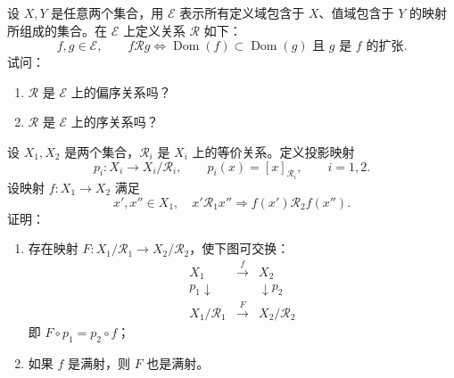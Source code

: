 \begin{exercise}
  \item 设 \(X,Y\) 是任意两个集合，用 \(\mathscr{E}\) 表示所有定义域包含于 \(X\)、值域包含于 \(Y\) 的映射所组成的集合。在 \(\mathscr{E}\) 上定义关系 \(\mathscr{R}\) 如下：
  \[
  f,g\in\mathscr{E},\qquad
  f\mathscr{R}g\iff
  \operatorname{Dom}(f)\subset\operatorname{Dom}(g)
  \text{ 且 }g\text{ 是 }f\text{ 的扩张}.
  \]
  试问：
  \begin{enumerate}[label=\arabic*)]
    \item \(\mathscr{R}\) 是 \(\mathscr{E}\) 上的偏序关系吗？
    \item \(\mathscr{R}\) 是 \(\mathscr{E}\) 上的序关系吗？
  \end{enumerate}
\end{exercise}

\begin{exercise}
  \item 设 \(X_1,X_2\) 是两个集合，\(\mathscr{R}_i\) 是 \(X_i\) 上的等价关系。定义投影映射
  \[
  p_i:X_i\to X_i/\mathscr{R}_i,\qquad
  p_i(x)=[x]_{\mathscr{R}_i},\qquad i=1,2.
  \]
  设映射 \(f:X_1\to X_2\) 满足
  \[
  x',x''\in X_1,\quad x'\mathscr{R}_1x''
  \Longrightarrow f(x')\mathscr{R}_2f(x'').
  \]
  证明：
  \begin{enumerate}[label=\arabic*)]
    \item 存在映射 \(F:X_1/\mathscr{R}_1\to X_2/\mathscr{R}_2\)，使下图可交换：
    \[
    \begin{array}{ccc}
      X_1 & \xrightarrow{\ f\ } & X_2\\
      {\scriptstyle p_1}\downarrow & & \downarrow{\scriptstyle p_2}\\
      X_1/\mathscr{R}_1 & \xrightarrow{\ F\ } & X_2/\mathscr{R}_2
    \end{array}
    \]
    即 \(F\circ p_1=p_2\circ f\)；
    \item 如果 \(f\) 是满射，则 \(F\) 也是满射。
  \end{enumerate}
\end{exercise}
